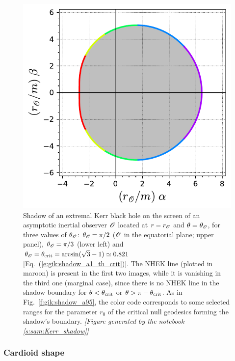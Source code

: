 \begin{figure}
\begin{center}
\includegraphics[height=0.28\textheight]{gik_shadow_a1_th_crit.pdf}
\end{center}
\caption[]{\label{f:gik:shadow_a1} \footnotesize
Shadow of an extremal Kerr black hole on the screen of an asymptotic
inertial observer $\mathscr{O}$ located at $r=r_{\mathscr{O}}$ and $\theta=\theta_{\mathscr{O}}$, for three
values of $\theta_{\mathscr{O}}$: $\theta_{\mathscr{O}} = \pi/2$ ($\mathscr{O}$ in the equatorial plane; upper panel),
$\theta_{\mathscr{O}} = \pi/3$ (lower left) and $\theta_{\mathscr{O}} = \theta_{\rm crit} = \arcsin(\sqrt{3} - 1) \simeq 0.821$
[Eq.~(\ref{e:gik:shadow_a1_th_crit})]. The NHEK line (plotted in maroon) is present in
the first two images, while
it is vanishing in the third one (marginal case), since there is no NHEK line in the shadow
boundary for $\theta < \theta_{\rm crit}$ or $\theta > \pi -  \theta_{\rm crit}$.
As in Fig.~\ref{f:gik:shadow_a95},
the color code corresponds to some selected ranges for the parameter $r_0$
of the critical null geodesics forming the shadow's boundary.
\textsl{[Figure generated by the notebook \ref{s:sam:Kerr_shadow}]}
}
\end{figure}

\subsubsection{Cardioid shape}

